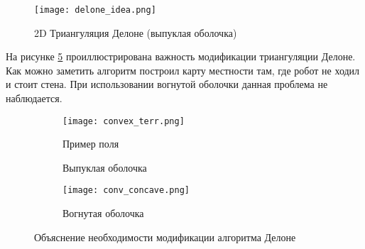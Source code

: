 \begin{figure}[ht!]
    \centering\texttt{[image: delone\_idea.png]}
    \caption{2D Триангуляция Делоне (выпуклая оболочка)}
    \label{fig:delone_idea.png}
\end{figure}

На рисунке \ref{fig:exp_concave_hull} проиллюстрирована  важность модификации триангуляции Делоне. Как можно заметить  алгоритм построил карту местности там, где робот не ходил и стоит стена. При использовании вогнутой оболочки  данная проблема не наблюдается.

\begin{figure}[H]
    \begin{subfigure}[t]{0.32\textwidth}
        \centering\texttt{[image: convex\_terr.png]}
        \caption{Пример поля}
        \label{fig:convex_terr.png}
    \end{subfigure}
    \begin{subfigure}[t]{0.32\textwidth}
        \centering
        \caption{Выпуклая оболочка}
        \label{fig:conv_convex.png}
    \end{subfigure}
    \begin{subfigure}[t]{0.32\textwidth}
        \centering\texttt{[image: conv\_concave.png]}
        \caption{Вогнутая оболочка}
        \label{fig:conv_concave.png}
    \end{subfigure}
    \caption{Объяснение необходимости модификации алгоритма Делоне}
    \label{fig:exp_concave_hull}
\end{figure}


